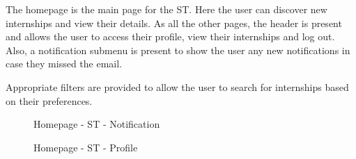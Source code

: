 \par The homepage is the main page for the ST. Here the user can discover new internships and view their details. As
all the other pages, the header is present and allows the user to access their profile, view their internships and
log out. Also, a notification submenu is present to show the user any new notifications in case they missed the email.

\par Appropriate filters are provided to allow the user to search for internships based on their preferences.

\begin{figure}[H]
    \centering
    \caption{Homepage - ST - Notification}
    \label{fig:homepage-st-notification}
\end{figure}

\begin{figure}[H]
    \centering
    \caption{Homepage - ST - Profile}
    \label{fig:homepage-st-profile}
\end{figure}

